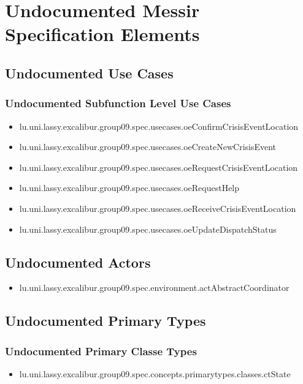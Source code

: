 	
\chapter{Undocumented Messir Specification Elements}


\section[Undocumented Use Cases]{Undocumented Use Cases}



\subsection[Undocumented Use Cases - Subfunction Level]{Undocumented Subfunction Level Use Cases}
\begin{itemize}
\item lu.uni.lassy.excalibur.group09.spec.usecases.oeConfirmCrisisEventLocation 
\item lu.uni.lassy.excalibur.group09.spec.usecases.oeCreateNewCrisisEvent 
\item lu.uni.lassy.excalibur.group09.spec.usecases.oeRequestCrisisEventLocation 
\item lu.uni.lassy.excalibur.group09.spec.usecases.oeRequestHelp 
\item lu.uni.lassy.excalibur.group09.spec.usecases.oeReceiveCrisisEventLocation 
\item lu.uni.lassy.excalibur.group09.spec.usecases.oeUpdateDispatchStatus 
\end{itemize}







\section[Undocumented Actors]{Undocumented Actors}
\begin{itemize}
\item lu.uni.lassy.excalibur.group09.spec.environment.actAbstractCoordinator 
\end{itemize}




\section[Undocumented Primary Types]{Undocumented Primary Types}

\subsection[Undocumented Primary Classe Types]{Undocumented Primary Classe Types}
\begin{itemize}
\item lu.uni.lassy.excalibur.group09.spec.concepts.primarytypes.classes.ctState 
\end{itemize}

